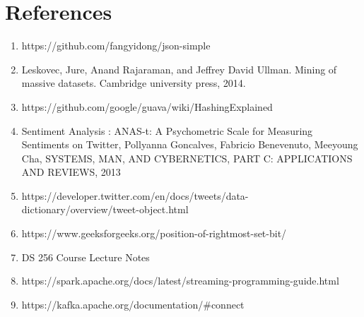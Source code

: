 \documentclass[11pt,a4paper,oneside]{article}
\begin{document}
    \section{References}
    \begin{enumerate}{}{}
    	\item https://github.com/fangyidong/json-simple
    	\item Leskovec, Jure, Anand Rajaraman, and Jeffrey David Ullman. Mining of massive datasets. Cambridge university press, 2014.
    	\item https://github.com/google/guava/wiki/HashingExplained
    	\item Sentiment Analysis : ANAS-t: A Psychometric Scale for Measuring Sentiments on Twitter, Pollyanna Goncalves, Fabricio Benevenuto, Meeyoung Cha, SYSTEMS, MAN, AND CYBERNETICS, PART C: APPLICATIONS AND REVIEWS, 2013
    	\item https://developer.twitter.com/en/docs/tweets/data-dictionary/overview/tweet-object.html
    	\item https://www.geeksforgeeks.org/position-of-rightmost-set-bit/
    	\item DS 256 Course Lecture Notes
    	\item https://spark.apache.org/docs/latest/streaming-programming-guide.html
    	\item https://kafka.apache.org/documentation/\#connect
    \end{enumerate}  
    
\end{document}
